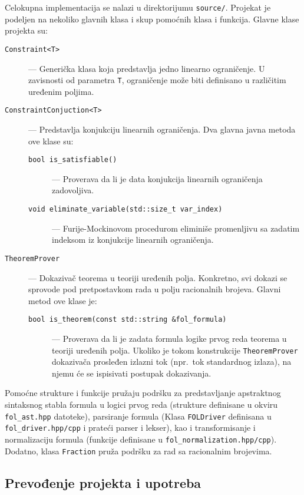 \documentclass[a4paper,10pt]{article}
\begin{document}
Celokupna implementacija se nalazi u direktorijumu \texttt{source/}. Projekat je podeljen na nekoliko glavnih klasa i skup pomoćnih klasa i funkcija. Glavne klase projekta su:

\begin{description}
    \item[\texttt{Constraint<T>}] --- Generička klasa koja predstavlja jedno linearno ograničenje. U zavisnosti od parametra \texttt{T}, ograničenje može biti definisano u različitim uređenim poljima.
    \item[\texttt{ConstraintConjuction<T>}] --- Predstavlja konjukciju linearnih ograničenja. Dva glavna javna metoda ove klase su:
        \begin{description}
            \item[\texttt{bool is\_satisfiable()}] --- Proverava da li je data konjukcija linearnih ograničenja zadovoljiva.
            \item[\texttt{void eliminate\_variable(std::size\_t var\_index)}] --- Furije-Mockinovom procedurom eliminiše promenljivu sa zadatim indeksom iz konjukcije linearnih ograničenja.
        \end{description}
    \item[\texttt{TheoremProver}] --- Dokazivač teorema u teoriji uređenih polja. Konkretno, svi dokazi se sprovode pod pretpostavkom rada u polju racionalnih brojeva. Glavni metod ove klase je:
    \begin{description}
        \item[\texttt{bool is\_theorem(const std::string \&fol\_formula)}] --- Proverava da li je zadata formula logike prvog reda teorema u teoriji uređenih polja. Ukoliko je tokom konstrukcije \texttt{TheoremProver} dokazivača prosleđen izlazni tok (npr.~tok standardnog izlaza), na njemu će se ispisivati postupak dokazivanja.
    \end{description}
\end{description}

Pomoćne strukture i funkcije pružaju podršku za predstavljanje apstraktnog sintaksnog stabla formula u logici prvog reda (strukture definisane u okviru \texttt{fol\_ast.hpp} datoteke), parsiranje formula (Klasa \texttt{FOLDriver} definisana u \texttt{fol\_driver.hpp/cpp} i prateći parser i lekser), kao i transformisanje i normalizaciju formula (funkcije definisane u \texttt{fol\_normalization.hpp/cpp}). Dodatno, klasa \texttt{Fraction} pruža podršku za rad sa racionalnim brojevima.

\subsection{Prevođenje projekta i upotreba}
\end{document}
